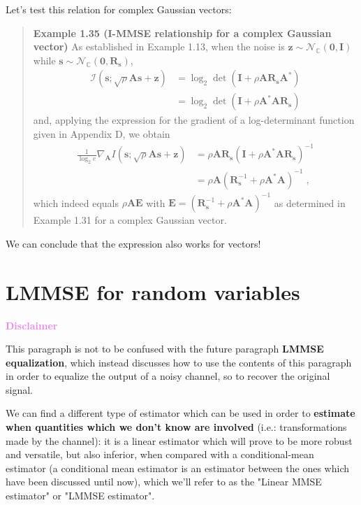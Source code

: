 \documentclass[a4paper, 12pt]{book}
\begin{document}
Let's test this relation for complex Gaussian vectors:

\begin{quote}
\small
\textbf{Example 1.35 (I-MMSE relationship for a complex Gaussian vector)}
As established in Example 1.13, when the noise is $\bm{z} \sim \mathcal{N}_{\mathbb{C}}(\bm{0}, \bm{I})$ while $\bm{s} \sim \mathcal{N}_{\mathbb{C}}(\bm{0}, \bm{R}_{\bm{s}})$,
\begin{align}
\mathcal{I}(\bm{s}; \sqrt{\rho}\bm{A}\bm{s} + \bm{z}) &= \log_2 \det(\bm{I} + \rho \bm{A} \bm{R}_{\bm{s}} \bm{A}^*) \tag{1.208} \\
&= \log_2 \det(\bm{I} + \rho \bm{A}^* \bm{A} \bm{R}_{\bm{s}}) \tag{1.209}
\end{align}
and, applying the expression for the gradient of a log-determinant function given in Appendix D, we obtain
\begin{align}
\frac{1}{\log_2 e} \nabla_{\bm{A}} I(\bm{s}; \sqrt{\rho}\bm{A}\bm{s} + \bm{z}) &= \rho \bm{A} \bm{R}_{\bm{s}}(\bm{I} + \rho \bm{A}^* \bm{A} \bm{R}_{\bm{s}})^{-1} \tag{1.210} \\
&= \rho \bm{A} (\bm{R}_{\bm{s}}^{-1} + \rho \bm{A}^* \bm{A})^{-1} \;, \tag{1.211}
\end{align}
which indeed equals $\rho \bm{A} \bm{E}$ with $\bm{E} = (\bm{R}_{\bm{s}}^{-1} + \rho \bm{A}^* \bm{A})^{-1}$ as determined in Example 1.31 for a complex Gaussian vector.
\end{quote}

We can conclude that the expression also works for vectors!

\section{LMMSE for random variables}

\begin{tcolorbox}[colframe=violet!60!white, colback=white, boxrule=1pt, arc=2pt]
    \textcolor{violet}{\textbf{Disclaimer}}

    This paragraph is not to be confused with the future paragraph \textcolor{green!60!black}{\textbf{LMMSE equalization}}, which instead discusses how to use the contents of this paragraph in order to equalize the output of a noisy channel, so to recover the original signal.
\end{tcolorbox}

We can find a different type of estimator which can be used in order to \textbf{estimate when quantities which we don't know are involved} (i.e.: transformations made by the channel): it is a linear estimator which will prove to be more robust and versatile, but also inferior, when compared with a conditional-mean estimator (a conditional mean estimator is an estimator between the ones which have been discussed until now), which we'll refer to as the "Linear MMSE estimator" or "LMMSE estimator".
\end{document}
